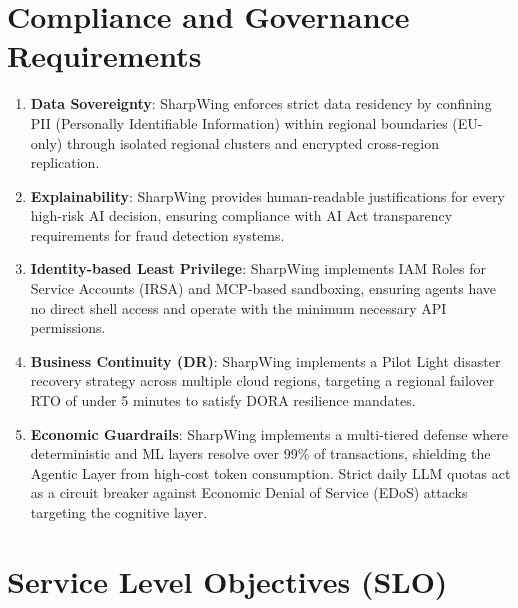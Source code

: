 \documentclass[12pt]{report}
\begin{document}
\section{Compliance and Governance Requirements}

\begin{enumerate}
  \item \textbf{Data Sovereignty}: SharpWing enforces strict data residency by confining PII (Personally Identifiable Information) within regional boundaries (EU-only) through isolated regional clusters and encrypted cross-region replication.
  
  \item \textbf{Explainability}: SharpWing provides human-readable justifications for every high-risk AI decision, ensuring compliance with AI Act transparency requirements for fraud detection systems.
  
  \item \textbf{Identity-based Least Privilege}: SharpWing implements IAM Roles for Service Accounts (IRSA) and MCP-based sandboxing, ensuring agents have no direct shell access and operate with the minimum necessary API permissions.
  
  \item \textbf{Business Continuity (DR)}: SharpWing implements a Pilot Light disaster recovery strategy across multiple cloud regions, targeting a regional failover RTO of under 5 minutes to satisfy DORA resilience mandates.
  
  \item \textbf{Economic Guardrails}: SharpWing implements a multi-tiered defense where deterministic and ML layers resolve over 99\% of transactions, shielding the Agentic Layer from high-cost token consumption. Strict daily LLM quotas act as a circuit breaker against Economic Denial of Service (EDoS) attacks targeting the cognitive layer.
\end{enumerate}

\section{Service Level Objectives (SLO)}
\end{document}
